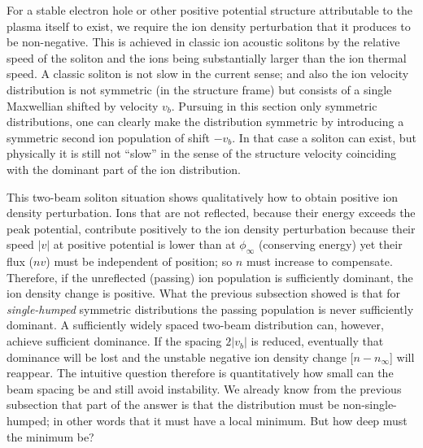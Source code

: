 \documentclass[12pt]{article}
\begin{document}
For a stable electron hole or other positive potential
structure attributable to the plasma itself to exist, we require the
ion density perturbation that it produces to be non-negative. This is
achieved in classic ion acoustic solitons by the relative speed of the
soliton and the ions being substantially larger than the ion thermal
speed. A classic soliton is not slow in the current
sense; and also the
ion velocity distribution is not symmetric (in the structure frame)
but consists of a single Maxwellian shifted by velocity
$v_b$. Pursuing in this section only symmetric distributions, one can
clearly make the distribution symmetric by introducing a symmetric
second ion population of shift $-v_b$.  In that case a soliton can
exist, but physically it is still not ``slow'' in the sense of the
structure velocity coinciding with the dominant part of the ion
distribution.

This two-beam soliton situation shows qualitatively how to obtain positive ion
density perturbation. Ions that are not reflected, because their
energy exceeds the peak potential, contribute positively to the ion
density perturbation because their speed $|v|$ at positive potential
is lower than at $\phi_\infty$ (conserving energy) yet their flux
($nv$) must be independent of position; so $n$ must increase to
compensate. Therefore, if the unreflected (passing) ion population is
sufficiently dominant, the ion density change is positive. What the
previous subsection showed is that for \emph{single-humped} symmetric
distributions the passing population is never sufficiently
dominant. A sufficiently widely spaced two-beam distribution can, however,
achieve sufficient dominance. If the spacing $2|v_b|$ is reduced,
eventually that dominance will be lost and the unstable negative
ion density change [$n-n_\infty$] will reappear. The intuitive question
therefore is quantitatively how small can the beam spacing be and
still avoid instability. We already know from the previous subsection
that part of the answer is that the distribution must be
non-single-humped; in other words that it must have a local minimum. But
how deep must the minimum be?
\end{document}
